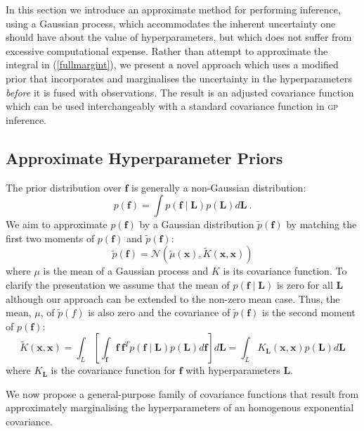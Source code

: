 \documentclass{article}
\renewcommand{\sc}[1]{{\scshape #1}}
\newcommand{\tK}{\tilde{K}}
\begin{document}
In this section we introduce an approximate method for performing inference, using a Gaussian process, which accommodates the inherent uncertainty one should have about the value of hyperparameters, but which does not suffer from excessive computational expense. Rather than attempt to approximate the integral in (\ref{fullmargint}), we present a novel approach which uses a modified prior that incorporates and marginalises the uncertainty in the hyperparameters \emph{before} it is fused with observations. The result is an adjusted covariance function which can be used interchangeably with a standard covariance function in \sc{gp} inference. %

\subsection{Approximate Hyperparameter Priors}

The prior distribution over $\mathbf{f}$ is generally a non-Gaussian distribution:
\begin{equation}
p(\mathbf{f}) = \int p(\mathbf{f}\mid \bm{L}) p(\bm{L}) d\bm{L}\ .
\end{equation}
We aim to approximate $p(\mathbf{f})$ by a Gaussian distribution 
$\tilde{p}(\mathbf{f})$ by matching the first two moments of 
$p(\mathbf{f})$ and $\tilde{p}(\mathbf{f})$:
\begin{equation}
\tilde{p}(\mathbf{f})=\mathcal{N}(\tilde{\mu}(\mathbf{x}),\tK(\mathbf{x},\mathbf{x}))
\end{equation}
where $\mu$ is the mean of a Gaussian process and $K$ is its covariance function.  To clarify the presentation we assume that the mean of $p(\mathbf{f}\mid \bm{L})$ is zero for all $\bm{L}$ although our approach can be extended to the non-zero mean case.  Thus, the mean, $\mu$, of $\tilde{p}(f)$ is also zero and the covariance of $\tilde{p}(\mathbf{f})$ is the second moment of $p(\mathbf{f})$:
\begin{equation}\label{eq:tK}
\tK(\mathbf{x},\mathbf{x})=\int_L \left[\int_{\mathbf{f}} \mathbf{f}\  \mathbf{f}^T p(\mathbf{f}\mid \bm{L}) p(\bm{L}) d\mathbf{f} \right] d\bm{L}=\int_L K_{\bm{L}}(\mathbf{x},\mathbf{x}) p(\bm{L}) d\bm{L}
\end{equation}
where $K_{\bm{L}}$ is the covariance function for $\mathbf{f}$ with hyperparameters $\bm{L}$.

We now propose a general-purpose family of covariance functions that result from approximately marginalising the hyperparameters of an homogenous exponential covariance. 
\end{document}
